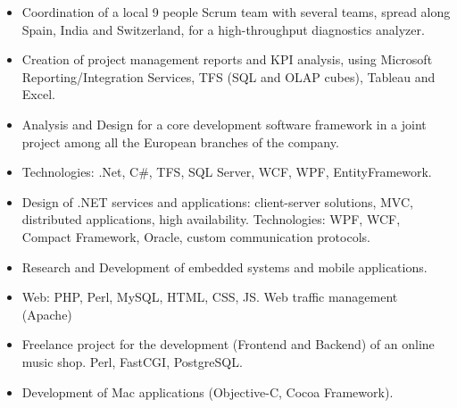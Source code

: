 \documentclass[10pt,a4paper]{altacv}
\begin{document}
\begin{itemize}
	\item Coordination of a local 9 people Scrum team with several teams, spread along Spain, India and Switzerland, for a high-throughput diagnostics analyzer.
	\item Creation of project management reports and KPI analysis, using Microsoft Reporting/Integration Services, TFS (SQL and OLAP cubes), Tableau and Excel.
\end{itemize}

\divider

\begin{itemize}
	\item Analysis and Design for a core development software framework in a joint project among all the European branches of the company.
	\item Technologies: .Net, C\#, TFS, SQL Server, WCF, WPF, EntityFramework.
\end{itemize}


\divider

\begin{itemize}
	\item Design of .NET services and applications: client-server solutions, MVC, distributed applications, high availability. Technologies: WPF, WCF, Compact Framework, Oracle, custom communication protocols.
	\item Research and Development of embedded systems and mobile applications.
\end{itemize}

\divider

\begin{itemize}
	\item Web: PHP, Perl, MySQL, HTML, CSS, JS. Web traffic management (Apache)
\end{itemize}



\begin{itemize}
	\item Freelance project for the development (Frontend and Backend) of an online music shop. Perl, FastCGI, PostgreSQL.
	\item Development of Mac applications (Objective-C, Cocoa Framework).
\end{itemize}
\end{document}
